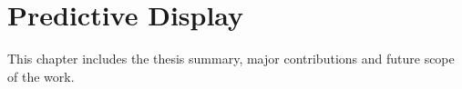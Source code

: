 \chapter{Predictive Display}
This chapter includes the thesis summary, major contributions and future scope of the work.

